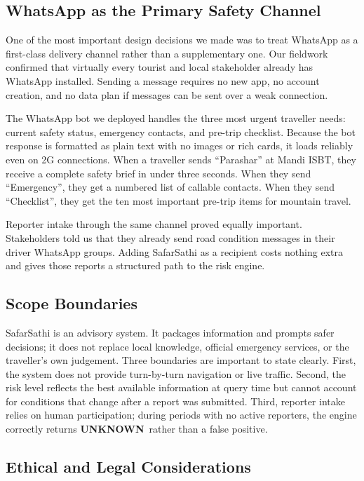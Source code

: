 \documentclass[12pt,a4paper]{article}
\newcommand{\riskunknown}{\cellcolor{lightgray}\textbf{UNKNOWN}}
\begin{document}
\subsection{WhatsApp as the Primary Safety Channel}

One of the most important design decisions we made was to treat WhatsApp as a first-class delivery channel rather than a supplementary one. Our fieldwork confirmed that virtually every tourist and local stakeholder already has WhatsApp installed. Sending a message requires no new app, no account creation, and no data plan if messages can be sent over a weak connection.

The WhatsApp bot we deployed handles the three most urgent traveller needs: current safety status, emergency contacts, and pre-trip checklist. Because the bot response is formatted as plain text with no images or rich cards, it loads reliably even on 2G connections. When a traveller sends ``Parashar'' at Mandi ISBT, they receive a complete safety brief in under three seconds. When they send ``Emergency'', they get a numbered list of callable contacts. When they send ``Checklist'', they get the ten most important pre-trip items for mountain travel.

Reporter intake through the same channel proved equally important. Stakeholders told us that they already send road condition messages in their driver WhatsApp groups. Adding SafarSathi as a recipient costs nothing extra and gives those reports a structured path to the risk engine.

\subsection{Scope Boundaries}

SafarSathi is an advisory system. It packages information and prompts safer decisions; it does not replace local knowledge, official emergency services, or the traveller's own judgement. Three boundaries are important to state clearly. First, the system does not provide turn-by-turn navigation or live traffic. Second, the risk level reflects the best available information at query time but cannot account for conditions that change after a report was submitted. Third, reporter intake relies on human participation; during periods with no active reporters, the engine correctly returns \riskunknown\ rather than a false positive.

\subsection{Ethical and Legal Considerations}
\end{document}
